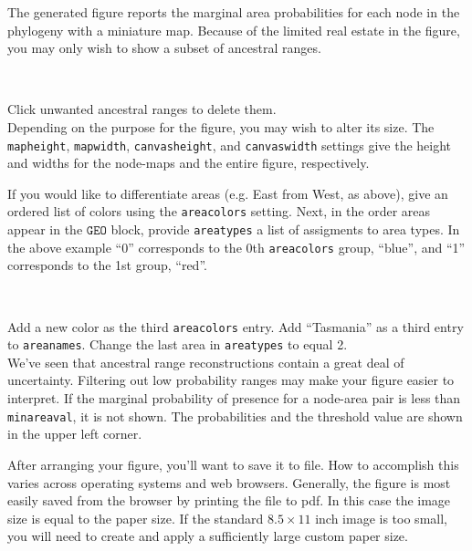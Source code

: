 \documentclass[11pt]{article}
\newcommand{\impmark}{\strut\vadjust{\domark}}
\newcommand{\domark}{%
  \vbox to 0pt{
    \kern-\dp\strutbox
    \smash{\llap{$\rightarrow$\kern1em}}
    \vss
  }%
}
\begin{document}
The generated figure reports the marginal area probabilities for each node in the phylogeny with a miniature map.
Because of the limited real estate in the figure, you may only wish to show a subset of ancestral ranges.

\noindent \\ \impmark  Click unwanted ancestral ranges to delete them. \\

Depending on the purpose for the figure, you may wish to alter its size.
The \texttt{mapheight}, \texttt{mapwidth}, \texttt{canvasheight}, and \texttt{canvaswidth} settings give the height and widths for the node-maps and the entire figure, respectively.

If you would like to differentiate areas (e.g. East from West, as above), give an ordered list of colors using the \texttt{areacolors} setting.
Next, in the order areas appear in the $\texttt{GEO}$ block, provide \texttt{areatypes} a list of assigments to area types.
In the above example ``0'' corresponds to the 0th \texttt{areacolors} group, ``blue'', and ``1'' corresponds to the 1st group, ``red''.

\noindent \\ \impmark Add a new color as the third \texttt{areacolors} entry. Add ``Tasmania'' as a third entry to \texttt{areanames}. Change the last area in \texttt{areatypes} to equal 2. \\

We've seen that ancestral range reconstructions contain a great deal of uncertainty.
Filtering out low probability ranges may make your figure easier to interpret.
If the marginal probability of presence for a node-area pair is less than \texttt{minareaval}, it is not shown.
The probabilities and the threshold value are shown in the upper left corner.

After arranging your figure, you'll want to save it to file.
How to accomplish this varies across operating systems and web browsers.
Generally, the figure is most easily saved from the browser by printing the file to pdf.
In this case the image size is equal to the paper size.
If the standard $8.5 \times 11$ inch image is too small, you will need to create and apply a sufficiently large custom paper size.

% 
\end{document}
